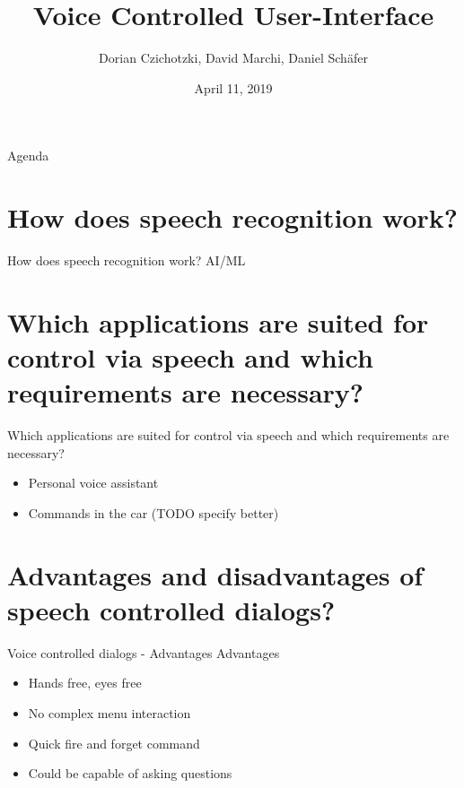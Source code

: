 \documentclass[
  10pt
, handout
]{beamer}
\title{Voice Controlled User-Interface}
\subtitle{}
\date{April 11, 2019}
\author{Dorian Czichotzki, David Marchi, Daniel Schäfer}
\begin{document}
\maketitle

\begin{frame}{Agenda}
  \tableofcontents[pausesections]
\end{frame}

\section{How does speech recognition work?}  %

\begin{frame}{How does speech recognition work?}
  AI/ML
\end{frame}

\section{Which applications are suited for control via speech and which requirements are necessary?}  %

\begin{frame}{Which applications are suited for control via speech and which requirements are necessary?}
  \begin{itemize}
    \item Personal voice assistant
    \item Commands in the car (TODO specify better)
  \end{itemize}
\end{frame}

\section{Advantages and disadvantages of speech controlled dialogs?}  %

\begin{frame}{Voice controlled dialogs - Advantages}
  Advantages

  \begin{itemize}
    \item Hands free, eyes free
    \item No complex menu interaction
    \item Quick fire and forget command
    \item Could be capable of asking questions
  \end{itemize}
\end{frame}
\end{document}
